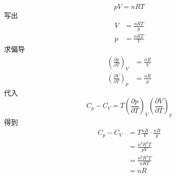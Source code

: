 \begin{equation}
    pV=nRT
\end{equation}
写出
\begin{equation}
    \begin{aligned}
        V&=\frac{nRT}{p}
\\
p&=\frac{nRT}{V}
    \end{aligned}
\end{equation}
求偏导
\begin{equation}
    \begin{aligned}
        \left( \frac{\partial p}{\partial T} \right) _V&=\frac{nR}{V}
\\
\left( \frac{\partial V}{\partial T} \right) _p&=\frac{nR}{p}
    \end{aligned}
\end{equation}
代入
\begin{equation}
    C_p-C_V=T\left( \frac{\partial p}{\partial T} \right) _V\left( \frac{\partial V}{\partial T} \right) _p
\end{equation}
得到
\begin{equation}
    \begin{aligned}
        C_p-C_V&=T\frac{nR}{V}\cdot \frac{nR}{p}
\\
&=\frac{n^2R^2T}{pV}
\\
&=\frac{n^2R^2T}{nRT}
\\
&=nR
    \end{aligned}
\end{equation}






